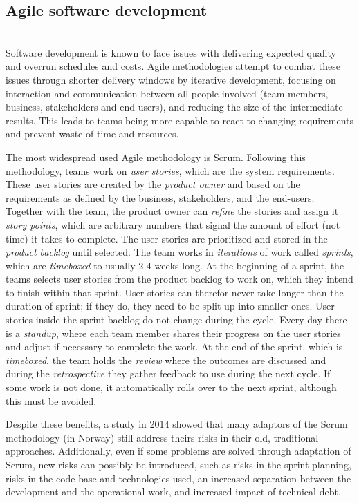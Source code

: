 \documentclass[sigconf]{acmart}
\begin{document}
\subsection{Agile software development} \\
Software development is known to face issues with delivering expected quality and overrun schedules and costs.\cite{dingsoyr2021managing}
Agile methodologies attempt to combat these issues through shorter delivery windows by iterative development, focusing on interaction and communication between all people involved (team members, business, stakeholders and end-users), and reducing the size of the intermediate results. 
This leads to teams being more capable to react to changing requirements and prevent waste of time and resources.\cite{cohen2004introduction}

The most widespread used Agile methodology is Scrum\cite{deemer2010scrum}. 
Following this methodology, teams work on \emph{user stories}, which are the system requirements. 
These user stories are created by the \emph{product owner} and based on the requirements as defined by the business, stakeholders, and the end-users. 
Together with the team, the product owner can \emph{refine} the stories and assign it \emph{story points}, which are arbitrary numbers that signal the amount of effort (not time) it takes to complete. 
The user stories are prioritized and stored in the \emph{product backlog} until selected. 
The team works in \emph{iterations} of work called \emph{sprints}, which are \emph{timeboxed} to usually 2-4 weeks long.
At the beginning of a sprint, the teams selects user stories from the product backlog to work on, which they intend to finish within that sprint. 
User stories can therefor never take longer than the duration of sprint; if they do, they need to be split up into smaller ones. 
User stories inside the sprint backlog do not change during the cycle. Every day there is a \emph{standup}, where each team member shares their progress on the user stories and adjust if necessary to complete the work. 
At the end of the sprint, which is \emph{timeboxed}, the team holds the \emph{review} where the outcomes are discussed and during the \emph{retrospective } they gather feedback to use during the next cycle. 
If some work is not done, it automatically rolls over to the next sprint, although this must be avoided.

Despite these benefits, a study in 2014 showed that many adaptors of the Scrum methodology (in Norway) still address theirs risks in their old, traditional approaches.\cite{siddique2014practical} Additionally, even if some problems are solved through adaptation of Scrum, new risks can possibly be introduced, such as risks in the sprint planning, risks in the code base and technologies used, an increased separation between the development and the operational work, and increased impact of technical debt\cite{kruchten2012technical}\cite{walczak2013risks}. \\
\end{document}

